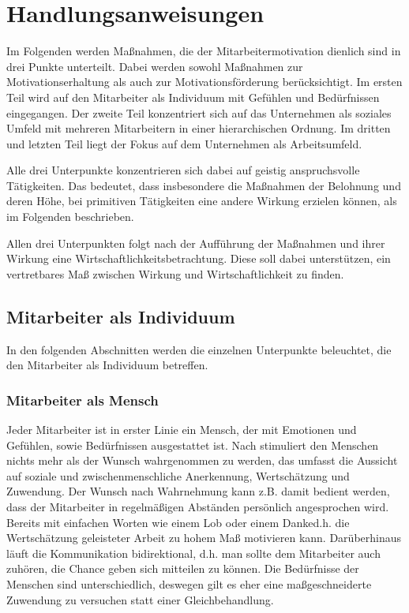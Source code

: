 \newpage
\section{Handlungsanweisungen}
Im Folgenden werden Maßnahmen, die der Mitarbeitermotivation dienlich sind in drei Punkte unterteilt. Dabei werden sowohl Maßnahmen zur Motivationserhaltung als auch zur Motivationsförderung berücksichtigt. 
Im ersten Teil wird auf den Mitarbeiter als Individuum mit Gefühlen und Bedürfnissen eingegangen. Der zweite Teil konzentriert sich auf das Unternehmen als soziales Umfeld mit mehreren Mitarbeitern in einer hierarchischen Ordnung. Im dritten und letzten Teil liegt der Fokus auf dem Unternehmen als Arbeitsumfeld.

Alle drei Unterpunkte konzentrieren sich dabei auf geistig anspruchsvolle Tätigkeiten. Das bedeutet, dass insbesondere die Maßnahmen der Belohnung und deren Höhe, bei primitiven Tätigkeiten eine andere Wirkung erzielen können, als im Folgenden beschrieben. 

Allen drei Unterpunkten folgt nach der Aufführung der Maßnahmen und ihrer Wirkung eine Wirtschaftlichkeitsbetrachtung. Diese soll dabei unterstützen, ein vertretbares Maß zwischen Wirkung und Wirtschaftlichkeit zu finden. 

\subsection{Mitarbeiter als Individuum}
In den folgenden Abschnitten werden die einzelnen Unterpunkte beleuchtet, die den Mitarbeiter als Individuum betreffen.

\subsubsection{Mitarbeiter als Mensch}
\label{sec:MitarbeiterAlsMensch}
Jeder Mitarbeiter ist in erster Linie ein Mensch, der mit Emotionen und Gefühlen, sowie Bedürfnissen ausgestattet ist. Nach \citet[S. 18]{Seelbach.2011}  stimuliert den Menschen nichts mehr als der Wunsch wahrgenommen zu werden, das umfasst die Aussicht auf soziale und zwischenmenschliche Anerkennung, Wertschätzung und Zuwendung. 
Der Wunsch nach Wahrnehmung kann z.B. damit bedient werden, dass der Mitarbeiter in regelmäßigen Abständen persönlich angesprochen wird. Bereits mit einfachen Worten wie einem Lob oder einem \glqq Danke\grqq d.h. die Wertschätzung geleisteter Arbeit zu hohem Maß motivieren kann. Darüberhinaus läuft die Kommunikation bidirektional, d.h. man sollte dem Mitarbeiter auch zuhören, die Chance geben sich mitteilen zu können. 
Die Bedürfnisse der Menschen sind unterschiedlich, deswegen gilt es eher eine maßgeschneiderte Zuwendung zu versuchen statt einer Gleichbehandlung. 

